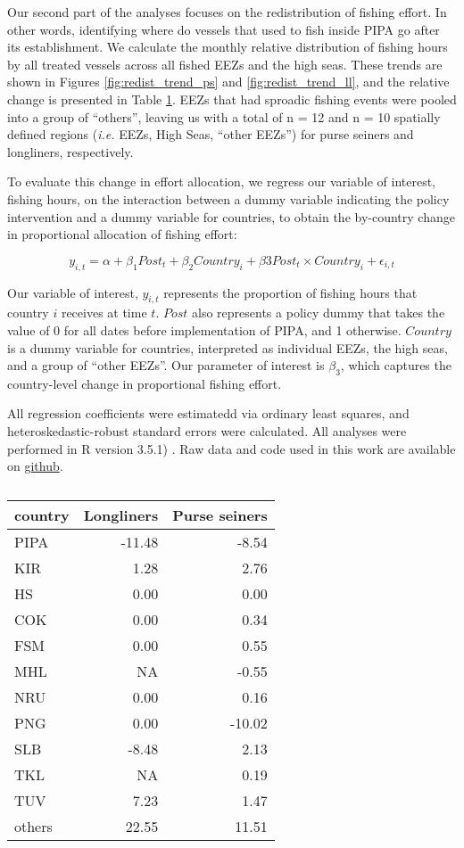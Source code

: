 \documentclass[12pt,]{article}
\begin{document}
Our second part of the analyses focuses on the redistribution of fishing
effort. In other words, identifying where do vessels that used to fish
inside PIPA go after its establishment. We calculate the monthly
relative distribution of fishing hours by all treated vessels across all
fished EEZs and the high seas. These trends are shown in Figures
\ref{fig:redist_trend_ps} and \ref{fig:redist_trend_ll}, and the
relative change is presented in Table \ref{tab:ba_disp}. EEZs that had
sproadic fishing events were pooled into a group of ``others'', leaving
us with a total of n = 12 and n = 10 spatially defined regions
(\emph{i.e.} EEZs, High Seas, ``other EEZs'') for purse seiners and
longliners, respectively.

To evaluate this change in effort allocation, we regress our variable of
interest, fishing hours, on the interaction between a dummy variable
indicating the policy intervention and a dummy variable for countries,
to obtain the by-country change in proportional allocation of fishing
effort:

\[
y_{i,t} = \alpha + \beta_1Post_t + \beta_2Country_i + \beta3Post_t \times Country_i + \epsilon_{i,t}
\]

Our variable of interest, \(y_{i,t}\) represents the proportion of
fishing hours that country \(i\) receives at time \(t\). \(Post\) also
represents a policy dummy that takes the value of 0 for all dates before
implementation of PIPA, and 1 otherwise. \(Country\) is a dummy variable
for countries, interpreted as individual EEZs, the high seas, and a
group of ``other EEZs''. Our parameter of interest is \(\beta_3\), which
captures the country-level change in proportional fishing effort.

All regression coefficients were estimatedd via ordinary least squares,
and heteroskedastic-robust standard errors were calculated. All analyses
were performed in R version 3.5.1) \citep{rcore_2018}. Raw data and code
used in this work are available on
\href{https://github.com/jcvdav/MPA_displacement}{github}.

\begin{table}[H]

\caption{\label{tab:unnamed-chunk-9}\label{tab:ba_disp}}
\centering
\begin{tabular}[t]{lrr}
\toprule
country & Longliners & Purse seiners\\
\midrule
PIPA & -11.48 & -8.54\\
KIR & 1.28 & 2.76\\
HS & 0.00 & 0.00\\
COK & 0.00 & 0.34\\
FSM & 0.00 & 0.55\\
\addlinespace
MHL & NA & -0.55\\
NRU & 0.00 & 0.16\\
PNG & 0.00 & -10.02\\
SLB & -8.48 & 2.13\\
TKL & NA & 0.19\\
\addlinespace
TUV & 7.23 & 1.47\\
others & 22.55 & 11.51\\
\bottomrule
\end{tabular}
\end{table}
\end{document}
